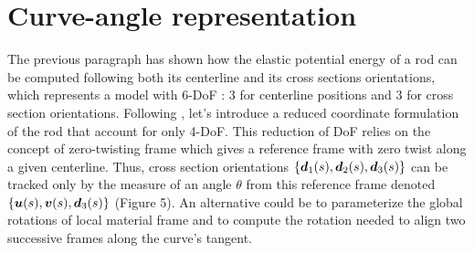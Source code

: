 \section{Curve-angle representation}
The previous paragraph has shown how the elastic potential energy of a rod can be computed following both its centerline and its cross sections orientations, which represents a model with 6-DoF : 3 for centerline positions and 3 for cross section orientations. Following \cite{Bergou2008}, let’s introduce a reduced coordinate formulation of the rod that account for only 4-DoF. This reduction of DoF relies on the concept of zero-twisting frame which gives a reference frame with zero twist along a given centerline. Thus, cross section orientations $\{\boldsymbol{d}_1 (s),\boldsymbol{d}_2 (s),\boldsymbol{d}_3 (s)\}$ can be tracked only by the measure of an angle $\theta$ from this reference frame denoted $\{\boldsymbol{u}(s),\boldsymbol{v}(s),\boldsymbol{d}_3 (s)\}$ (Figure 5). An alternative could be to parameterize the global rotations of local material frame and to compute the rotation needed to align two successive frames along the curve’s tangent.

